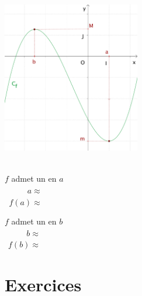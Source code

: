 \begin{minipage}[c]{0.4\linewidth}
  \centering
  \includegraphics[width=6cm]{F_Extrema.pdf}
\end{minipage}
\quad
\begin{minipage}[c]{0.4\linewidth}
  \centering
  \ \\
  $f$ admet un \hspace{2cm} en $a$  \\[2ex]
  $\phantom{f(a)}a\approx$ \\[2ex]
  $\phantom{a}f(a)\approx $ \\[2em]
  
  \bigskip

  $f$ admet un \hspace{2cm} en $b$  \\[2ex]
  $\phantom{f(b)}b\approx$ \\[2ex]
  $\phantom{b}f(b)\approx $   
\end{minipage}



\section{Exercices}



